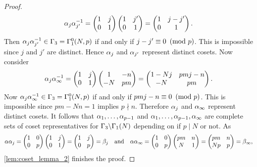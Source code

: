\begin{proof}
      \[
        \alpha_{j}\alpha_{j'}^{-1} = \begin{pmatrix} 1 & j \\ 0 & 1 \end{pmatrix}\begin{pmatrix} 1 & j' \\ 0 & 1 \end{pmatrix} = \begin{pmatrix} 1 & j-j' \\ 0 & 1 \end{pmatrix}.
      \]
      Then $\alpha_{j}\alpha_{j'}^{-1} \in \Gamma_{3} = \Gamma_{1}^{0}(N,p)$ if and only if $j-j' \equiv 0 \ \left(\text{mod }p\right)$. This is impossible since $j$ and $j'$ are distinct. Hence $\alpha_{j}$ and $\alpha_{j'}$ represent distinct cosets. Now consider
      \[
        \alpha_{j}\alpha_{\infty}^{-1} = \begin{pmatrix} 1 & j \\ 0 & 1 \end{pmatrix}\begin{pmatrix} 1 & -n \\ -N & pm \end{pmatrix} = \begin{pmatrix} 1-Nj & pmj-n \\ -N & pm \end{pmatrix}.
      \]
      Now $\alpha_{j}\alpha_{\infty}^{-1} \in  \Gamma_{3} = \Gamma_{1}^{0}(N,p)$ if and only if $pmj-n \equiv 0 \ \left(\text{mod }p\right)$. This is impossible since $pm-Nn = 1$ implies $p \nmid n$. Therefore $\alpha_{j}$ and $\alpha_{\infty}$ represent distinct cosets. It follows that $\alpha_{1},\ldots,\alpha_{p-1}$ and $\alpha_{1},\ldots,\alpha_{p-1},\alpha_{\infty}$ are complete sets of coset representatives for $\Gamma_{3}\backslash\Gamma_{1}(N)$ depending on if $p \mid N$ or not. As
      \[
        \alpha\alpha_{j} = \begin{pmatrix} 1 & 0 \\ 0 & p \end{pmatrix}\begin{pmatrix} 1 & j \\ 0 & 1 \end{pmatrix} = \begin{pmatrix} 1 & j \\ 0 & p \end{pmatrix} = \beta_{j} \quad \text{and} \quad \alpha\alpha_{\infty} = \begin{pmatrix} 1 & 0 \\ 0 & p \end{pmatrix}\begin{pmatrix} pm & n \\ N & 1 \end{pmatrix} = \begin{pmatrix} pm & n \\ Np & p \end{pmatrix} = \beta_{\infty},
      \]
      \cref{lem:coset_lemma_2} finishes the proof.
    \end{proof}

